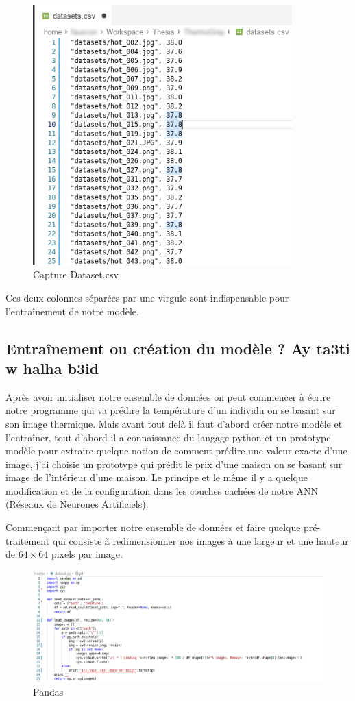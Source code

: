 \documentclass[12pt]{article}
\begin{document}
\begin{figure}[h]
	\centering
	\includegraphics[width=10cm]{img-Chapiter-4/datasets.png}
	\caption{Capture Dataset.csv}
	\label{fig:dataset.csv}
\end{figure}

Ces deux colonnes séparées par une virgule sont indispensable pour l’entraînement de notre modèle.

\subsection{Entraînement ou création du modèle ? Ay ta3ti w halha b3id}
Après avoir initialiser notre ensemble de données on peut commencer à écrire notre programme qui va prédire la température d’un individu on se basant sur son image thermique. Mais avant tout delà il faut d’abord créer notre modèle et l’entraîner, tout d’abord il a  connaissance du langage python et un prototype modèle pour extraire quelque notion de comment prédire une valeur exacte d’une image, j’ai choisie un prototype qui prédit le prix d’une maison on se basant sur image de l'intérieur d’une maison. Le principe et le même il y a quelque modification et de la configuration dans les couches cachées de notre ANN (Réseaux de Neurones Artificiels).

Commençant par importer notre ensemble de données et faire quelque pré-traitement qui consiste à redimensionner nos images à une largeur et une hauteur de $64 \times 64$ pixels par image.

\begin{figure}[h]
	\centering
	\includegraphics[width=16cm]{img-Chapiter-4/loaddataset.png}
	\caption{Pandas}
\end{figure}
\end{document}
